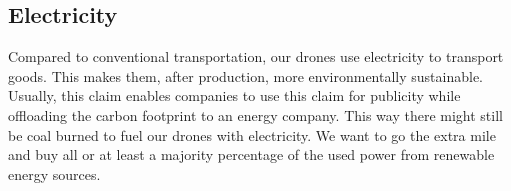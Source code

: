 \subsection{Electricity}
Compared to conventional transportation, our drones use electricity to transport goods. This makes them, after production, more environmentally sustainable. Usually, this claim enables companies to use this claim for publicity while offloading the carbon footprint to an energy company. This way there might still be coal burned to fuel our drones with electricity.
\newline
We want to go the extra mile and buy all or at least a majority percentage of the used power from renewable energy sources.
